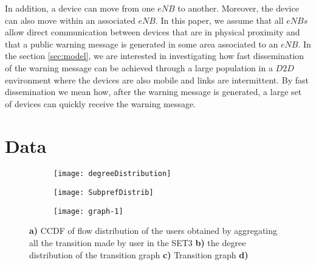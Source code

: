 \documentclass[review]{elsarticle}
\begin{document}
In addition, a device can move from one $eNB$ to another. Moreover, the device can also move within an associated $eNB$. In this paper, we assume that all $eNBs$ allow direct communication between devices that are in physical proximity and that a public warning message is generated in some area associated to an $eNB$. In the section \ref{sec:model}, we are interested in investigating how fast dissemination of the warning message can be achieved through a large population in a $D2D$ environment where the devices are also mobile and links are intermittent. By fast dissemination we mean how, after the warning message is generated, a large set of devices can quickly receive the warning message.

\section{Data}\label{sec:C3_Data Analysis}
\captionsetup[subfigure]{labelformat=empty}
\begin{figure*}\centering
    \begin{subfigure}[b]{0.35\textwidth}
         \texttt{[image: degreeDistribution]}
	\caption{}
	\label{fig:distributiona}
    \end{subfigure}	
    \begin{subfigure}[b]{0.35\textwidth}
         \texttt{[image: SubprefDistrib]}
         \caption{}
	\label{fig:distributionb}
    \end{subfigure}
    \begin{subfigure}[b]{0.28\textwidth}
         \texttt{[image: graph-1]}
         \caption{}
	\label{fig:graph}
    \end{subfigure}
    \caption{\textbf{a)} CCDF of flow distribution of the users obtained by aggregating all the transition made by user in the SET3 \textbf{b)} the degree distribution of the transition graph \textbf{c)} Transition graph \textbf{d)}}
    \label{fig:distribution}
\end{figure*}
\end{document}
